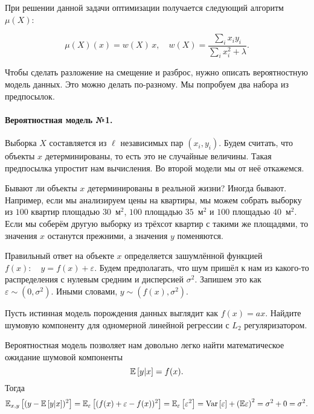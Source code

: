 \documentclass[12pt,fleqn]{article}
\begin{document}
При решении данной задачи оптимизации получается следующий алгоритм $\mu(X)$:

$$
\mu(X)(x) = w(X ) \,x, \quad w(X) = \dfrac{\sum_i x_i y_i}{\sum_i x_i^2 + \lambda}.
$$

Чтобы сделать разложение на смещение и разброс, нужно описать вероятностную модель данных.
Это можно делать по-разному.
Мы попробуем два набора из предпосылок.

\paragraph{Вероятностная модель №1.}
Выборка $X$ составляется из $\ell$ независимых пар $(x_i, y_i)$.
Будем считать, что объекты $x$ детерминированы, то есть это не случайные величины.
Такая предпосылка упростит нам вычисления.
Во второй модели мы от неё откажемся.

Бывают ли объекты $x$ детерминированы в реальной жизни?
Иногда бывают.
Например, если мы анализируем цены на квартиры, мы можем собрать выборку из $100$ квартир площадью $30$~м$^2$, $100$ площадью $35$~м$^2$ и $100$ площадью $40$~м$^2.$
Если мы соберём другую выборку из трёхсот квартир с такими же площадями, то значения $x$ останутся прежними, а значения $y$ поменяются.

Правильный ответ на объекте $x$ определяется зашумлённой функцией $f(x):\quad y = f(x) + \varepsilon$.
Будем предполагать, что шум пришёл к нам из какого-то распределения с нулевым средним и дисперсией $\sigma^2$.
Запишем это как $\varepsilon \sim (0, \sigma^2).$
Иными словами, $y \sim (f(x), \sigma^2).$

\begin{vkProblem}
Пусть истинная модель порождения данных выглядит как $f(x) = ax$.
Найдите шумовую компоненту для одномерной линейной регрессии с $L_2$ регуляризатором.
\end{vkProblem}
\begin{esSolution}
    Вероятностная модель позволяет нам довольно легко найти математическое ожидание шумовой компоненты
    $$
    \mathbb{E}\left[y|x\right] = f(x).
    $$
    Тогда
    $$
    \mathbb{E}_{x, y}\left[(y - \mathbb{E}\left[y|x\right] )^2\right] = 
    \mathbb{E}_{\varepsilon}\left[(f(x) + \varepsilon - f(x) )^2\right] = 
    \mathbb{E}_{\varepsilon}\left[\varepsilon^2\right] = \text{Var}\left[\varepsilon\right] + \left(\mathbb{E}\varepsilon\right)^2 = \sigma^2 + 0 = \sigma^2.
    $$
\end{esSolution}
\end{document}
